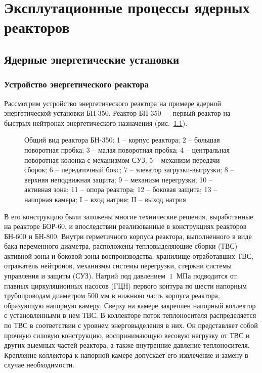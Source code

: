 \chapter{Эксплутационные процессы ядерных реакторов}


\section{Ядерные энергетические установки}\label{Reactor}

\subsection{Устройство энергетического реактора}

Рассмотрим устройство энергетического реактора на примере ядерной энергетической установки БН-350.
Реактор БН-350 --- первый реактор на быстрых нейтронах энергетического  назначения (рис.~\ref{pic:basic-view}).
\begin{figure}[p]
\caption[Общий вид реактора БН-350]{Общий вид реактора БН-350: 1 -- корпус реактора; 2 -- большая поворотная пробка; 3 -- малая поворотная пробка; 4 -- центральная поворотная колонка с механизмом СУЗ; 5 -- механизм передачи сборок; 6 -- передаточный бокс; 7 -- элеватор загрузки-выгрузки; 8 -- верхняя неподвижная защита; 9 -- механизм перегрузки; 10 -- активная зона; 11 -- опора реактора; 12 -- боковая защита; 13 -- напорная камера; I -- вход натрия; II -- выход натрия}
\label{pic:basic-view}
\end{figure}
В его конструкцию были заложены многие технические решения, выработанные на реакторе БОР-60, и впоследствии реализованные в конструкциях реакторов БН-600 и БН-800.
Внутри герметичного корпуса реактора, выполненного в виде бака переменного диаметра, расположены тепловыделяющие сборки (ТВС) активной зоны и боковой зоны воспроизводства, хранилище отработавших ТВС, отражатель нейтронов, механизмы системы перегрузки, стержни системы управления и защиты (СУЗ).
Натрий под давлением $~1$~МПа подводится от главных циркуляционных насосов (ГЦН) первого контура по шести напорным трубопроводам диаметром 500 мм в нижнюю часть корпуса реактора, образующую напорную камеру.
Сверху на камере закреплен напорный коллектор с установленными в нем ТВС.
В коллекторе поток теплоносителя распределяется по ТВС в соответствии с уровнем энерговыделения в них.
Он представляет собой прочную силовую конструкцию, воспринимающую весовую нагрузку от ТВС и других выемных частей реактора, а также внутренние давление теплоносителя.
Крепление коллектора к напорной камере допускает его извлечение и замену в случае необходимости.

